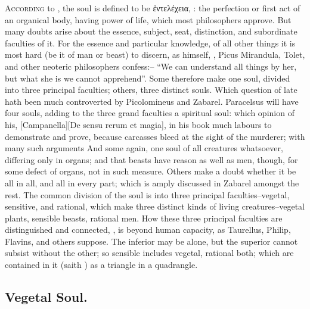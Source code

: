 \lettrine{A}{ccording} to \Aristotle{}, the soul is defined
to be \textgreek{ἐντελέχεια}, : the perfection or first act of an organical body,
having power of life, which most philosophers approve. But
many doubts arise about the essence, subject, seat, distinction, and
subordinate faculties of it. For the essence and particular knowledge, of all
other things it is most hard (be it of man or beast) to discern, as
\Aristotle{} himself, \Tully{},
Picus Mirandula, Tolet, and other
neoteric philosophers confess:-- \enquote{We can understand all
things by her, but what she is we cannot apprehend}. Some therefore make one
soul, divided into three principal faculties; others, three distinct souls.
Which question of late hath been much controverted by Picolomineus and Zabarel.
Paracelsus will have four souls, adding to the three grand
faculties a spiritual soul: which opinion of his,
[Campanella][\textlatin{De sensu rerum et magia}], in his
book  much labours to
demonstrate and prove, because carcasses bleed at the sight of the murderer;
with many such arguments And some again, one soul of all
creatures whatsoever, differing only in organs; and that beasts have reason as
well as men, though, for some defect of organs, not in such measure. Others
make a doubt whether it be all in all, and all in every part; which is amply
discussed in Zabarel amongst the rest. The common division
of the soul is into three principal faculties--vegetal, sensitive, and
rational, which make three distinct kinds of living creatures--vegetal plants,
sensible beasts, rational men. How these three principal faculties are
distinguished and connected, , is beyond
human capacity, as Taurellus, Philip, Flavins, and others
suppose. The inferior may be alone, but the superior cannot subsist without the
other; so sensible includes vegetal, rational both; which are contained in it
(saith \Aristotle{})  as a triangle in a quadrangle.

\subsection{Vegetal Soul.}


